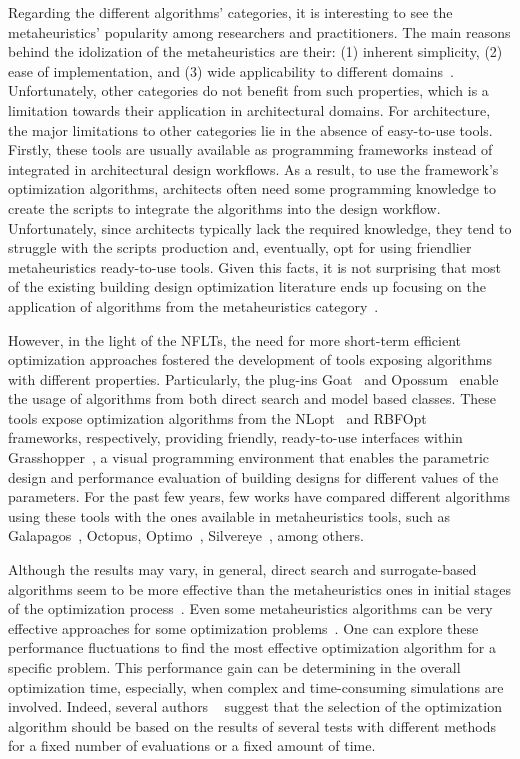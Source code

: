 	Regarding the different algorithms' categories, it is interesting to see the metaheuristics' popularity among researchers and practitioners. The main reasons behind the idolization of the metaheuristics are their: (1) inherent simplicity, (2) ease of implementation, and (3) wide applicability to different domains~\cite{Wortmann2017ADO}. Unfortunately, other categories do not benefit from such properties, which is a limitation towards their application in architectural domains. For architecture, the major limitations to other categories lie in the absence of easy-to-use tools. Firstly, these tools are usually available as programming frameworks instead of integrated in architectural design workflows. As a result, to use the framework's optimization algorithms, architects often need some programming knowledge to create the scripts to integrate the algorithms into the design workflow. Unfortunately, since architects typically lack the required knowledge, they tend to struggle with the scripts production and, eventually, opt for using friendlier metaheuristics ready-to-use tools. Given this facts, it is not surprising that most of the existing building design optimization literature ends up focusing on the application of algorithms from the metaheuristics category~\cite{Hamdy2016,Nguyen2014,Evins2013}. 
		
	However, in the light of the \acp{NFLT}, the need for more short-term efficient optimization approaches fostered the development of tools exposing algorithms with different properties. Particularly, the plug-ins Goat~\cite{GOAT} and Opossum~\cite{Wortmann2017Opossum} enable the usage of algorithms from both direct search and model based classes. These tools expose optimization algorithms from the NLopt~\cite{NLOPT} and RBFOpt~\cite{RBFOPT} frameworks, respectively, providing friendly, ready-to-use interfaces within Grasshopper~\cite{GRASSHOPPER}, a visual programming environment that enables the parametric design and performance evaluation of building designs for different values of the parameters. For the past few years, few works have compared different algorithms using these tools with the ones available in metaheuristics tools, such as Galapagos~\cite{GALAPAGOS}, Octopus\cite{OCTOPUS}, Optimo~\cite{OPTIMO}, Silvereye~\cite{Cichocka2017SILVEREYE}, among others.
	
	Although the results may vary, in general, direct search and surrogate-based algorithms seem to be more effective than the metaheuristics ones in initial stages of the optimization process~\cite{Wortmann2017,Wortmann2016BBO,Wortmann2017GABESTCHOICE}. Even some metaheuristics algorithms can be very effective approaches for some optimization problems~\cite{Waibel2018}. 
One can explore these performance fluctuations to find the most effective optimization algorithm for a specific problem. This performance gain can be determining in the overall optimization time, especially, when complex and time-consuming simulations are involved. Indeed, several authors ~\cite{Wortmann2016BBO,Hamdy2016} suggest that the selection of the optimization algorithm should be based on the results of several tests with different methods for a fixed number of evaluations or a fixed amount of time. 

